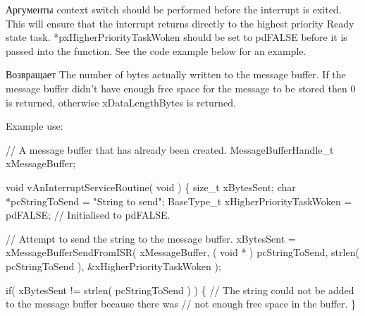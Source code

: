 \begin{DoxyPre}
\begin{DoxyPre}
\begin{DoxyParams}{Аргументы}
   context switch should be performed before the interrupt is exited.  This will
   ensure that the interrupt returns directly to the highest priority Ready
   state task.  *pxHigherPriorityTaskWoken should be set to pdFALSE before it
   is passed into the function.  See the code example below for an example.\\
\hline
\end{DoxyParams}
\begin{DoxyReturn}{Возвращает}
The number of bytes actually written to the message buffer.  If the
   message buffer didn't have enough free space for the message to be stored
   then 0 is returned, otherwise xDataLengthBytes is returned.
\end{DoxyReturn}
Example use:

\begin{DoxyPre}
// A message buffer that has already been created.
MessageBufferHandle\_t xMessageBuffer;\end{DoxyPre}
\end{DoxyPre}
\end{DoxyPre}



\begin{DoxyPre}
\begin{DoxyPre}
\begin{DoxyPre}void vAnInterruptServiceRoutine( void )
\{
size\_t xBytesSent;
char *pcStringToSend = "String to send";
BaseType\_t xHigherPriorityTaskWoken = pdFALSE; // Initialised to pdFALSE.\end{DoxyPre}
\end{DoxyPre}
\end{DoxyPre}



\begin{DoxyPre}
\begin{DoxyPre}
\begin{DoxyPre}    // Attempt to send the string to the message buffer.
    xBytesSent = xMessageBufferSendFromISR( xMessageBuffer,
                                            ( void * ) pcStringToSend,
                                            strlen( pcStringToSend ),
                                            \&xHigherPriorityTaskWoken );\end{DoxyPre}
\end{DoxyPre}
\end{DoxyPre}



\begin{DoxyPre}
\begin{DoxyPre}
\begin{DoxyPre}    if( xBytesSent != strlen( pcStringToSend ) )
    \{
        // The string could not be added to the message buffer because there was
        // not enough free space in the buffer.
    \}\end{DoxyPre}
\end{DoxyPre}
\end{DoxyPre}



